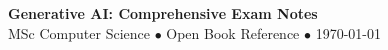 \documentclass[10pt,a4paper,twocolumn]{article}
\begin{document}
\begin{center}
{\LARGE\textbf{Generative AI: Comprehensive Exam Notes}}\\[2pt]
{\small MSc Computer Science $\bullet$ Open Book Reference $\bullet$ \today}
\end{center}

\vspace{-8pt}
\tableofcontents
\vspace{-4pt}










\end{document}
